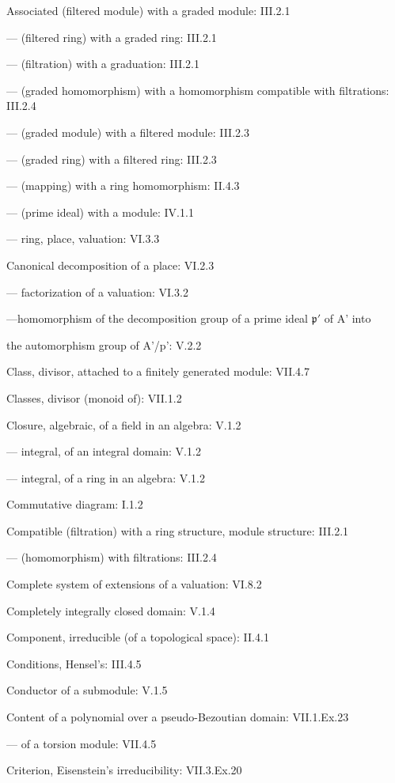 Associated (filtered module) with a graded module: III.2.1

--- (filtered ring) with a graded ring: III.2.1

--- (filtration) with a graduation: III.2.1

--- (graded homomorphism) with a homomorphism compatible with filtrations: III.2.4

--- (graded module) with a filtered module: III.2.3

--- (graded ring) with a filtered ring: III.2.3

--- (mapping) with a ring homomorphism: II.4.3

--- (prime ideal) with a module: IV.1.1

--- ring, place, valuation: VI.3.3

Canonical decomposition of a place: VI.2.3

--- factorization of a valuation: VI.3.2

---homomorphism of the decomposition group of a prime ideal \(\mathfrak{p}'\) of A' into

the automorphism group of A'/p': V.2.2

Class, divisor, attached to a finitely generated module: VII.4.7

Classes, divisor (monoid of): VII.1.2

Closure, algebraic, of a field in an algebra: V.1.2

--- integral, of an integral domain: V.1.2

--- integral, of a ring in an algebra: V.1.2

Commutative diagram: I.1.2

Compatible (filtration) with a ring structure, module structure: III.2.1

--- (homomorphism) with filtrations: III.2.4

Complete system of extensions of a valuation: VI.8.2

Completely integrally closed domain: V.1.4

Component, irreducible (of a topological space): II.4.1

Conditions, Hensel's: III.4.5

Conductor of a submodule: V.1.5

Content of a polynomial over a pseudo-Bezoutian domain: VII.1.Ex.23

--- of a torsion module: VII.4.5

Criterion, Eisenstein's irreducibility: VII.3.Ex.20

